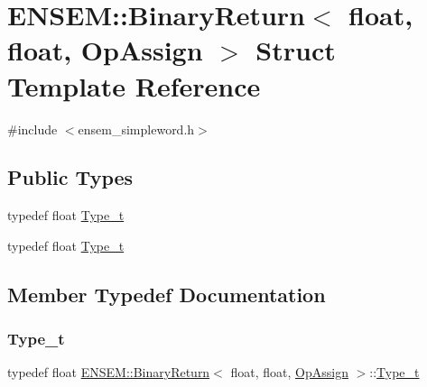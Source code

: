 \hypertarget{structENSEM_1_1BinaryReturn_3_01float_00_01float_00_01OpAssign_01_4}{}\section{E\+N\+S\+EM\+:\+:Binary\+Return$<$ float, float, Op\+Assign $>$ Struct Template Reference}
\label{structENSEM_1_1BinaryReturn_3_01float_00_01float_00_01OpAssign_01_4}


{\ttfamily \#include $<$ensem\+\_\+simpleword.\+h$>$}

\subsection*{Public Types}
\begin{DoxyCompactItemize}
\item 
typedef float \mbox{\hyperlink{structENSEM_1_1BinaryReturn_3_01float_00_01float_00_01OpAssign_01_4_a65f1032b48415f3cc75ef4be460c1b06}{Type\+\_\+t}}
\item 
typedef float \mbox{\hyperlink{structENSEM_1_1BinaryReturn_3_01float_00_01float_00_01OpAssign_01_4_a65f1032b48415f3cc75ef4be460c1b06}{Type\+\_\+t}}
\end{DoxyCompactItemize}


\subsection{Member Typedef Documentation}
\mbox{\label{structENSEM_1_1BinaryReturn_3_01float_00_01float_00_01OpAssign_01_4_a65f1032b48415f3cc75ef4be460c1b06}} 
\subsubsection{\texorpdfstring{Type\_t}{Type\_t}\hspace{0.1cm}{\footnotesize\ttfamily [1/2]}}
{\footnotesize\ttfamily typedef float \mbox{\hyperlink{structENSEM_1_1BinaryReturn}{E\+N\+S\+E\+M\+::\+Binary\+Return}}$<$ float, float, \mbox{\hyperlink{structENSEM_1_1OpAssign}{Op\+Assign}} $>$\+::\mbox{\hyperlink{structENSEM_1_1BinaryReturn_3_01float_00_01float_00_01OpAssign_01_4_a65f1032b48415f3cc75ef4be460c1b06}{Type\+\_\+t}}}

